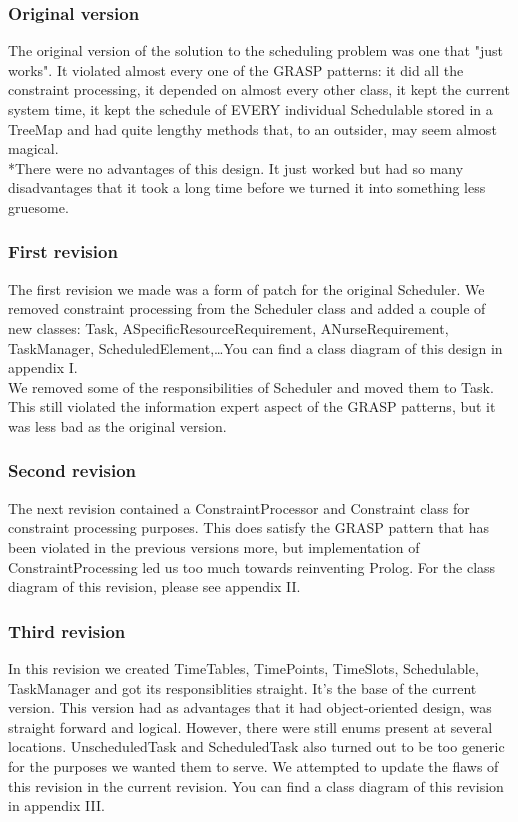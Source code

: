 \documentclass[11pt]{article}
\begin{document}
\subsubsection{Original version}
The original version of the solution to the scheduling problem was one that "just works". It violated almost every one of the GRASP patterns: it did all the constraint processing, it depended on almost every other class, it kept the current system time, it kept the schedule of EVERY individual Schedulable stored in a TreeMap and had quite lengthy methods that, to an outsider, may seem almost magical.
\\*There were no advantages of this design. It just worked but had so many disadvantages that it took a long time before we turned it into something less gruesome.

\subsubsection{First revision}
The first revision we made was a form of patch for the original Scheduler. We removed constraint processing from the Scheduler class and added a couple of new classes: Task, ASpecificResourceRequirement, ANurseRequirement, TaskManager, ScheduledElement,\dots You can find a class diagram of this design in appendix I.\\
We removed some of the responsibilities of Scheduler and moved them to Task. This still violated the information expert aspect of the GRASP patterns, but it was less bad as the original version.

\subsubsection{Second revision}
The next revision contained a ConstraintProcessor and Constraint class for constraint processing purposes. This does satisfy the GRASP pattern that has been violated in the previous versions more, but implementation of ConstraintProcessing led us too much towards reinventing Prolog. For the class diagram of this revision, please see appendix II.

\subsubsection{Third revision}
In this revision we created TimeTables, TimePoints, TimeSlots, Schedulable, TaskManager and got its responsiblities straight. It's the base of the current version.  This version had as advantages that it had object-oriented design, was straight forward and logical. However, there were still enums present at several locations. UnscheduledTask and ScheduledTask also turned out to be too generic for the purposes we wanted them to serve. We attempted to update the flaws of this revision in the current revision. You can find a class diagram of this revision in appendix III.
\end{document}
